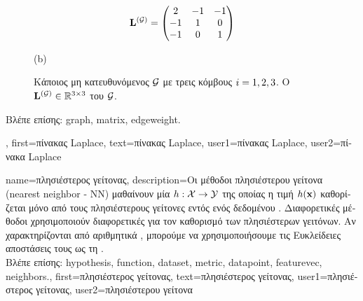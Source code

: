 {{\begin{figure}[H]
\begin{center}
\begin{minipage}{0.45\textwidth}
\begin{equation}
	 				 {\bf L}^{(\mathcal{G})} = \begin{pmatrix} 2 & -1& -1 \\ -1& 1 & 0 \\  -1 & 0 & 1 \end{pmatrix}  
	 				 \nonumber
	 			\end{equation} 
				\begin{minipage}{\textwidth}
				\vspace{3.5ex}
				\centering
				{\selectfont (b)}
				\end{minipage}
	 	\end{minipage}
		{
	 	\caption{\label{fig_lap_mtx_dict}  \foreignlanguage{greek}{Κάποιος μη κατευθυνόμενος}  $\mathcal{G}$ 
		 	\foreignlanguage{greek}{με τρεις κόμβους $i=1,2,3$.}  \foreignlanguage{greek}{Ο}  
			 ${\bf L}^{(\mathcal{G})}  \in \mathbb{R}^{3 \times 3}$ 
			\foreignlanguage{greek}{του} $\mathcal{G}$.} }
	 	\end{center}
	 	\end{figure}
		\foreignlanguage{greek}{Βλέπε επίσης:} \gls{graph}, \gls{matrix}, \gls{edgeweight}.},
	first={\foreignlanguage{greek}{πίνακας} Laplace},
	text={\foreignlanguage{greek}{πίνακας} Laplace},
	user1={\foreignlanguage{greek}{πίνακας} Laplace}, %
  	user2={\foreignlanguage{greek}{πίνακα} Laplace} %
}

{name={\foreignlanguage{greek}{πλησιέστερος γείτονας}},
	description={\foreignlanguage{greek}{Οι μέθοδοι πλησιέστερου γείτονα} 
		(nearest neighbor - NN) \foreignlanguage{greek}{μαθαίνουν μία}  
		$h: \mathcal{X} \rightarrow \mathcal{Y}$ \foreignlanguage{greek}{της οποίας η τιμή}  
		$h({\bf x})$ \foreignlanguage{greek}{καθορίζεται μόνο από τους πλησιέστερους γείτονες εντός ενός 
		δεδομένου} . \foreignlanguage{greek}{Διαφορετικές μέθοδοι χρησιμοποι\-ούν διαφορετικές}
		 \foreignlanguage{greek}{για τον καθορισμό των πλησιέστερων γειτόνων. Αν}   
		\foreignlanguage{greek}{χαρακτηρίζονται από αριθμητικά} , \foreignlanguage{greek}{μπορούμε 
		να χρησιμοποιήσουμε τις Ευκλείδειες αποστάσεις τους ως τη} .\\
		\foreignlanguage{greek}{Βλέπε επίσης:} \gls{hypothesis}, \gls{function}, \gls{dataset}, \gls{metric}, \gls{datapoint}, \gls{featurevec}, \gls{neighbors}.},
	first={\foreignlanguage{greek}{πλησιέστερος γείτονας}},
	text={\foreignlanguage{greek}{πλησιέστερος γείτονας}},
	user1={\foreignlanguage{greek}{πλησιέστερος γείτονας}}, %
   	user2={\foreignlanguage{greek}{πλησιέστερου γείτονα}} %
}

